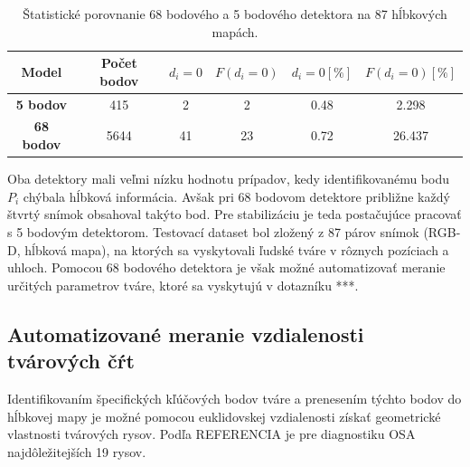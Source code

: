 \begin{table}[h]
	\caption{\label{tab:dlib:compare} Štatistické porovnanie 68 bodového a 5 bodového detektora na 87 hĺbkových mapách.}
	\centering
	\begin{tabular}{cccccc}
		\toprule
		\textbf{Model} & \textbf{Počet bodov} & \textbf{$d_i=0$} & \textbf{$F(d_i=0)$} & \textbf{$d_i=0 [\%]$ } & \textbf{$F(d_i=0) [\%]$} \\ 
		\midrule
		\textbf{5 bodov} 	& 415 	& 2		& 2		& 0.48	& 2.298 \\
		\textbf{68 bodov} 	& 5644	& 41 	& 23	& 0.72	& 26.437 \\
		\bottomrule
	\end{tabular}
\end{table}

Oba detektory mali veľmi nízku hodnotu prípadov, kedy identifikovanému bodu $P_i$ chýbala hĺbková informácia.  Avšak pri 68 bodovom detektore približne každý štvrtý snímok obsahoval takýto bod. Pre stabilizáciu je teda postačujúce pracovať s 5 bodovým detektorom. Testovací dataset bol zložený z 87 párov snímok (RGB-D, hĺbková mapa), na ktorých sa vyskytovali ľudské tváre v rôznych pozíciach a uhloch. Pomocou 68 bodového detektora je však možné automatizovať meranie určitých parametrov tváre, ktoré sa vyskytujú v dotazníku ***. 


\subsection{Automatizované meranie vzdialenosti tvárových čŕt}

Identifikovaním špecifických kľúčových bodov tváre a prenesením týchto bodov do hĺbkovej mapy je možné pomocou euklidovskej vzdialenosti získať geometrické vlastnosti tvárových rysov. Podľa REFERENCIA je pre diagnostiku OSA najdôležitejších 19 rysov. 

